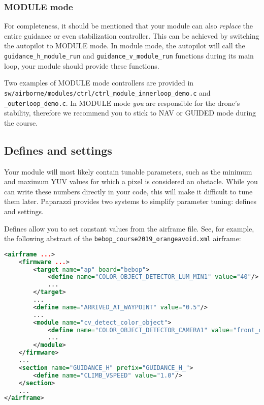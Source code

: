\documentclass{article}
\begin{document}
\subsubsection{MODULE mode}
For completeness, it should be mentioned that your module can also \emph{replace} the entire guidance or even stabilization controller. This can be achieved by switching the autopilot to MODULE mode. In module mode, the autopilot will call the \texttt{guidance\_h\_module\_run} and \texttt{guidance\_v\_module\_run} functions during its main loop, your module should provide these functions.

Two examples of MODULE mode controllers are provided in \texttt{sw/airborne/modules/ctrl/ctrl\_module\_innerloop\_demo.c} and \texttt{\_outerloop\_demo.c}. In MODULE mode \emph{you} are responsible for the drone's stability, therefore we recommend you to stick to NAV or GUIDED mode during the course.




\subsection{Defines and settings}\label{sec:settings}
Your module will most likely contain tunable parameters, such as the minimum and maximum YUV values for which a pixel is considered an obstacle. While you can write these numbers directly in your code, this will make it difficult to tune them later. Paparazzi provides two systems to simplify parameter tuning: defines and settings.

Defines allow you to set constant values from the airframe file. See, for example, the following abstract of the \texttt{bebop\_course2019\_orangeavoid.xml} airframe:
\begin{lstlisting}[language=xml]
<airframe ...>
	<firmware ...>
		<target name="ap" board="bebop">
			<define name="COLOR_OBJECT_DETECTOR_LUM_MIN1" value="40"/>
			...
		</target>
		...
		<define name="ARRIVED_AT_WAYPOINT" value="0.5"/>
		...
		<module name="cv_detect_color_object">
			<define name="COLOR_OBJECT_DETECTOR_CAMERA1" value="front_camera"/>
			...
		</module>
	</firmware>
	...
	<section name="GUIDANCE_H" prefix="GUIDANCE_H_">
		<define name="CLIMB_VSPEED" value="1.0"/>
	</section>
	...
</airframe>
\end{lstlisting}
\end{document}
